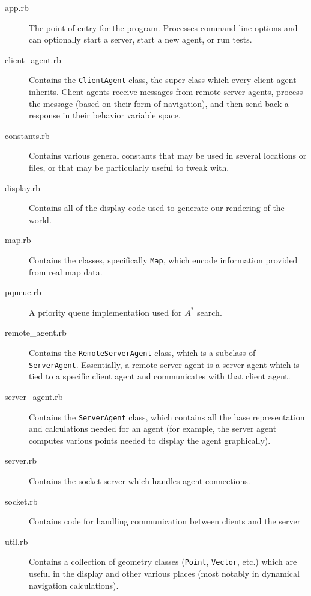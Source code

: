 \documentclass{article}
\newcommand{\code}{\texttt}
\begin{document}
\begin{description}
\item[app.rb] The point of entry for the program. Processes
  command-line options and can optionally start a server, start a new
  agent, or run tests.

\item[client\_agent.rb] Contains the \code{ClientAgent} class, the
  super class which every client agent inherits. Client agents receive
  messages from remote server agents, process the message (based on
  their form of navigation), and then send back a response in their
  behavior variable space.

\item[constants.rb] Contains various general constants that may be
  used in several locations or files, or that may be particularly useful to
  tweak with.

\item[display.rb] Contains all of the display code used to generate
  our rendering of the world.

\item[map.rb] Contains the classes, specifically \code{Map}, which
  encode information provided from real map data.

\item[pqueue.rb] A priority queue implementation used for $A^*$ search.

\item[remote\_agent.rb] Contains the \code{RemoteServerAgent} class,
  which is a subclass of \code{ServerAgent}. Essentially, a remote
  server agent is a server agent which is tied to a specific client
  agent and communicates with that client agent.

\item[server\_agent.rb] Contains the \code{ServerAgent} class, which
  contains all the base representation and calculations needed for an agent (for
  example, the server agent computes various points needed to display the agent
  graphically).

\item[server.rb] Contains the socket server which handles agent connections.

\item[socket.rb] Contains code for handling communication between
  clients and the server

\item[util.rb] Contains a collection of geometry classes
  (\code{Point}, \code{Vector}, etc.) which are useful in the display
  and other various places (most notably in dynamical navigation
  calculations).


\end{description}
\end{document}
